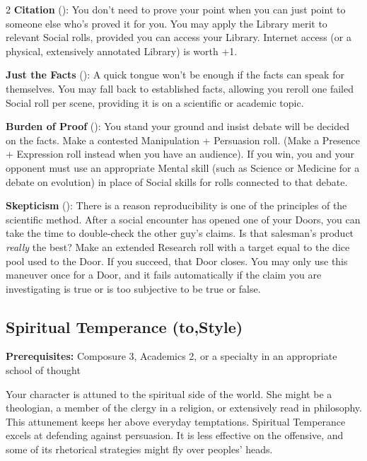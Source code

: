 \begin{multicols}{2}
\textbf{Citation} (\textbullet\textbullet): You don't need to prove your point when you can just point to someone else who's proved it for you. You may apply the Library merit to relevant Social rolls, provided you can access your Library. Internet access (or a physical, extensively annotated Library) is worth +1. 

\textbf{Just the Facts} (\textbullet\textbullet\textbullet): A quick tongue won't be enough if the facts can speak for themselves. You may fall back to established facts, allowing you reroll one failed Social roll per scene, providing it is on a scientific or academic topic.

\textbf{Burden of Proof} (\textbullet\textbullet\textbullet\textbullet): You stand your ground and insist debate will be decided on the facts. Make a contested Manipulation + Persuasion roll. (Make a Presence + Expression roll instead when you have an audience). If you win, you and your opponent must use an appropriate Mental skill (such as Science or Medicine for a debate on evolution) in place of Social skills for rolls connected to that debate.

\textbf{Skepticism} (\textbullet\textbullet\textbullet\textbullet\textbullet): There is a reason reproducibility is one of the principles of the scientific method. After a social encounter has opened one of your Doors, you can take the time to double-check the other guy's claims. Is that salesman's product \textit{really} the best? Make an extended Research roll with a target equal to the dice pool used to the Door. If you succeed, that Door closes. You may only use this maneuver once for a Door, and it fails automatically if the claim you are investigating is true or is too subjective to be true or false.


\subsection*{Spiritual Temperance (\textbullet\nobreak\hspace{.16667em}to\nobreak\hspace{.16667em}\textbullet\textbullet\textbullet\textbullet\textbullet,\nobreak\hspace{.16667em}Style)}

\textbf{Prerequisites:} Composure 3, Academics 2, or a specialty in an appropriate school of thought

Your character is attuned to the spiritual side of the world. She might be a theologian, a member of the clergy in a religion, or extensively read in philosophy. This attunement keeps her above everyday temptations. Spiritual Temperance excels at defending against persuasion. It is less effective on the offensive, and some of its rhetorical strategies might fly over peoples' heads. 


\end{multicols}
